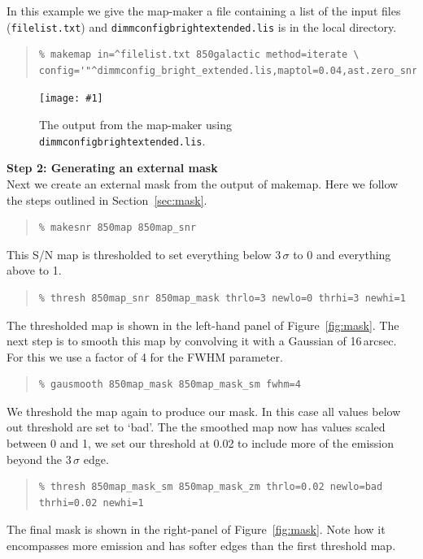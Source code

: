 \documentclass[twoside,11pt]{article}
\newcommand{\htmladdimg}[1]{}
\newcommand{\htmlref}[2]{#1}
\newcommand{\latexhtml}[2]{#1}
\newcommand{\xref}[3]{#1}
\renewcommand{\_}{\texttt{\symbol{95}}}
\newenvironment{myquote}{
   \color{MidnightBlue}\begin{quote}\begin{small}}{
   \end{small}\end{quote}
}
\newcommand{\task}[1]{\textsf{#1}}
\newcommand{\file}[1]{\texttt{#1}}
\newcommand{\makemap}{\xref{\task{makemap}}{sun258}{MAKEMAP}}
\newcommand{\myfig}[6]{
  \begin{figure}#2
    \centering\texttt{[image: \#1]}
    \typeout{#1 inserted on page \arabic{page}}
    \caption[#5]{\label{#4}\small #6}
  \end{figure}
}
\newcommand{\myfig}[6]{
    \label{#4} \htmladdimg{#1.png}\\
    \\
    Figure: #6\\
  }
\newcommand{\cref}[3]{\latexhtml{#1~\ref{#2}}{\htmlref{#3}{#2}}}
\renewenvironment{myquote}{
      \begin{quote}\begin{small}}{
      \end{small}\end{quote}
   }
\begin{document}
In this example we give the map-maker a file containing a list of the
input files (\file{filelist.txt}) and
\file{dimmconfig\_bright\_extended.lis} is in the local directory.

\begin{myquote}
\begin{verbatim}
% makemap in=^filelist.txt 850galactic method=iterate \
config='"^dimmconfig_bright_extended.lis,maptol=0.04,ast.zero_snr=3.5"'
\end{verbatim}
\end{myquote}

\myfig{sc21_gal_11}{[t!]}{width=0.6\linewidth}{fig:galmakemap}{
  Galactic example: initial reduction using \file{dimmconfig\_bright\_extended.lis}}{
  The output from the map-maker using \file{dimmconfig\_bright\_extended.lis}.
}

\textbf{Step 2: Generating an external mask}
\vspace{0.2cm}\\
Next we create an external mask from the output of \makemap. Here we
follow the steps outlined in \cref{Section}{sec:mask}{Masking options}.

\begin{myquote}
\begin{verbatim}
% makesnr 850map 850map_snr
\end{verbatim}
\end{myquote}

This S/N map is thresholded to set everything below 3\,$\sigma$ to 0 and
everything above to 1.

\begin{myquote}
\begin{verbatim}
% thresh 850map_snr 850map_mask thrlo=3 newlo=0 thrhi=3 newhi=1
\end{verbatim}
\end{myquote}
The thresholded map is shown in the left-hand panel of
\cref{Figure}{fig:mask}{this figure}. The next step is to smooth this map
by convolving it with a Gaussian of 16\,arcsec. For this we use a factor
of 4 for the FWHM parameter.

\begin{myquote}
\begin{verbatim}
% gausmooth 850map_mask 850map_mask_sm fwhm=4
\end{verbatim}
\end{myquote}

We threshold the map again to produce our mask. In this case all
values below out threshold are set to `bad'. The the smoothed map now
has values scaled between 0 and 1, we set our threshold at 0.02 to
include more of the emission beyond the 3\,$\sigma$ edge.
\begin{myquote}
\begin{verbatim}
% thresh 850map_mask_sm 850map_mask_zm thrlo=0.02 newlo=bad thrhi=0.02 newhi=1
\end{verbatim}
\end{myquote}
The final mask is shown in the right-panel of \cref{Figure}{fig:mask}{the figure below}.
Note how it encompasses more emission and has softer edges than the
first threshold map. \\
\end{document}
